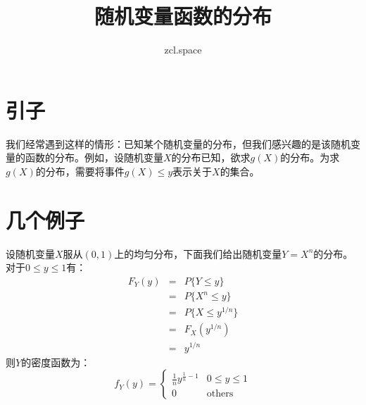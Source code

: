\documentclass[10pt,a4paper,UTF8]{article}
\author{zcl.space}
\date{}
\title{随机变量函数的分布}
\begin{document}
\maketitle
\tableofcontents
{}

\section{引子}
\label{sec:orgf24f4ed}


我们经常遇到这样的情形：已知某个随机变量的分布，但我们感兴趣的是该随机变量的函数的分布。例如，设随机变量\(X\)的分布已知，欲求\(g(X)\)的分布。为求\(g(X)\)的分布，需要将事件\(g(X) \leq y\)表示关于\(X\)的集合。
\section{几个例子}
\label{sec:orgcaa50a1}


\begin{tikzinstance}
设随机变量\(X\)服从\((0,1)\)上的均匀分布，下面我们给出随机变量\(Y = X^{n}\)的分布。对于\(0 \leq y \leq 1\)有：
\begin{eqnarray}
\label{eq:1}
F_{Y}(y) &=& P\{Y \leq y\}  \\
&=& P\{X^{n} \leq y\} \\
&=& P\{X \leq y^{1/n}\} \\
&=& F_{X}(y^{1/n}) \\
&=& y^{1/n}
\end{eqnarray}
则\(Y\)的密度函数为：
\begin{equation}
\label{eq:2}
f_{Y}(y) =
\begin{cases}
\frac{1}{n}y^{\tfrac{1}{n}-1} & 0 \leq y \leq 1 \\
0 & \mathrm{others}
\end{cases}
\end{equation}
\end{tikzinstance}
\end{document}
